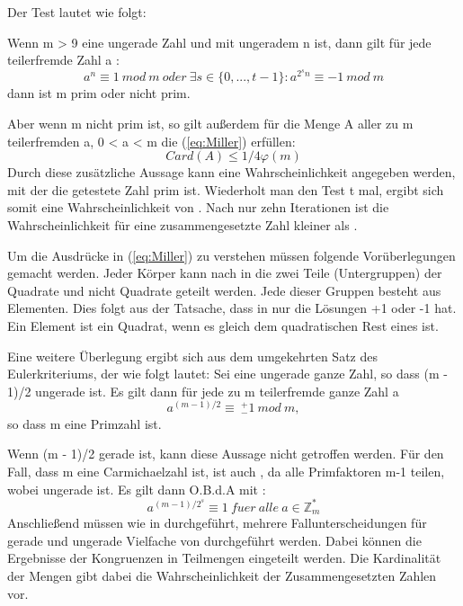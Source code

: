 		 Der Test lautet wie folgt:
		 
		 Wenn m \myin {} > 9  eine ungerade Zahl und  mit ungeradem n ist, dann gilt für jede teilerfremde Zahl a \myin {}:		 
	 	\begin{equation} \label{eq:Miller}
			a^n \equiv 1~mod~m~oder~\exists s \in \{0,..., t - 1\} : a^{2^sn} \equiv -1~mod~m
		\end{equation}
		dann ist m prim oder nicht prim.
		
		Aber wenn m nicht prim ist, so gilt außerdem für die Menge A aller zu m teilerfremden a, 0 < a < m die (\ref{eq:Miller}) erfüllen:
	 	\begin{displaymath}
		 	Card(A) \leq 1/4 \varphi(m)
	 	\end{displaymath}
	 	Durch diese zusätzliche Aussage kann eine Wahrscheinlichkeit angegeben werden, mit der die getestete Zahl prim ist. Wiederholt man den Test t mal, ergibt sich somit eine Wahrscheinlichkeit von . Nach nur zehn Iterationen ist die Wahrscheinlichkeit für eine zusammengesetzte Zahl kleiner als .
	 	
	 	Um die Ausdrücke in (\ref{eq:Miller}) zu verstehen müssen folgende Vorüberlegungen gemacht werden.
	 	Jeder Körper  kann nach \cite{Algorithmische:Zahlentheorie} in die zwei Teile (Untergruppen) der Quadrate und nicht Quadrate geteilt werden. Jede dieser Gruppen besteht aus  Elementen. Dies folgt aus der Tatsache, dass  in  nur die Lösungen +1 oder -1 hat. Ein Element ist ein Quadrat, wenn es gleich dem quadratischen Rest eines  ist.
	 	
	 	Eine weitere Überlegung ergibt sich aus dem umgekehrten Satz des Eulerkriteriums, der wie folgt lautet:
	 	Sei  eine ungerade ganze Zahl, so dass (m - 1)/2 ungerade ist.
	 	Es gilt dann für jede zu m teilerfremde ganze Zahl a
	 	\begin{displaymath}
		 	a^{(m-1)/2} \equiv~^+_-1~mod~m,
	 	\end{displaymath}
	 	so dass m eine Primzahl ist.
	 	
	 	Wenn (m - 1)/2 gerade ist, kann diese Aussage nicht getroffen werden. Für den Fall, dass m eine Carmichaelzahl ist, ist auch  , da alle Primfaktoren m-1 teilen, wobei  ungerade ist. Es gilt dann O.B.d.A mit :
 		\begin{displaymath}
	 		a^{(m-1)/2^s} \equiv1 ~fuer~alle~a \in \mathbb{Z}^*_m
 		\end{displaymath}
 		Anschließend müssen wie in \cite{Algorithmische:Zahlentheorie} durchgeführt, mehrere Fallunterscheidungen für gerade und ungerade Vielfache von  durchgeführt werden. Dabei können die Ergebnisse der Kongruenzen in Teilmengen eingeteilt werden. Die Kardinalität der Mengen gibt dabei die Wahrscheinlichkeit der Zusammengesetzten Zahlen vor.
 		
